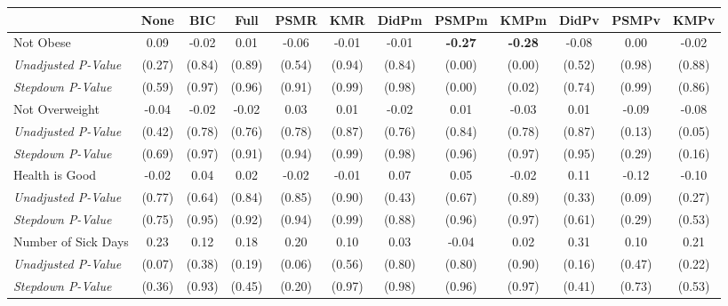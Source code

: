 \begin{tabular}{l c c c c c c c c c c c}
\toprule
 & None & BIC & Full & PSMR & KMR & DidPm & PSMPm & KMPm & DidPv & PSMPv & KMPv \\
\midrule
Not Obese & 0.09 & -0.02 & 0.01 & -0.06 & -0.01 & -0.01 & \textbf{ -0.27 } & \textbf{ -0.28 } & -0.08 & 0.00 & -0.02 \\
\quad \textit{Unadjusted P-Value} & (0.27) & (0.84) & (0.89) & (0.54) & (0.94) & (0.84) & (0.00) & (0.00) & (0.52) & (0.98) & (0.88) \\
\quad \textit{Stepdown P-Value} & (0.59) & (0.97) & (0.96) & (0.91) & (0.99) & (0.98) & (0.00) & (0.02) & (0.74) & (0.99) & (0.86) \\
Not Overweight & -0.04 & -0.02 & -0.02 & 0.03 & 0.01 & -0.02 & 0.01 & -0.03 & 0.01 & -0.09 & -0.08 \\
\quad \textit{Unadjusted P-Value} & (0.42) & (0.78) & (0.76) & (0.78) & (0.87) & (0.76) & (0.84) & (0.78) & (0.87) & (0.13) & (0.05) \\
\quad \textit{Stepdown P-Value} & (0.69) & (0.97) & (0.91) & (0.94) & (0.99) & (0.98) & (0.96) & (0.97) & (0.95) & (0.29) & (0.16) \\
Health is Good & -0.02 & 0.04 & 0.02 & -0.02 & -0.01 & 0.07 & 0.05 & -0.02 & 0.11 & -0.12 & -0.10 \\
\quad \textit{Unadjusted P-Value} & (0.77) & (0.64) & (0.84) & (0.85) & (0.90) & (0.43) & (0.67) & (0.89) & (0.33) & (0.09) & (0.27) \\
\quad \textit{Stepdown P-Value} & (0.75) & (0.95) & (0.92) & (0.94) & (0.99) & (0.88) & (0.96) & (0.97) & (0.61) & (0.29) & (0.53) \\
Number of Sick Days & 0.23 & 0.12 & 0.18 & 0.20 & 0.10 & 0.03 & -0.04 & 0.02 & 0.31 & 0.10 & 0.21 \\
\quad \textit{Unadjusted P-Value} & (0.07) & (0.38) & (0.19) & (0.06) & (0.56) & (0.80) & (0.80) & (0.90) & (0.16) & (0.47) & (0.22) \\
\quad \textit{Stepdown P-Value} & (0.36) & (0.93) & (0.45) & (0.20) & (0.97) & (0.98) & (0.96) & (0.97) & (0.41) & (0.73) & (0.53) \\
\bottomrule
\end{tabular}

